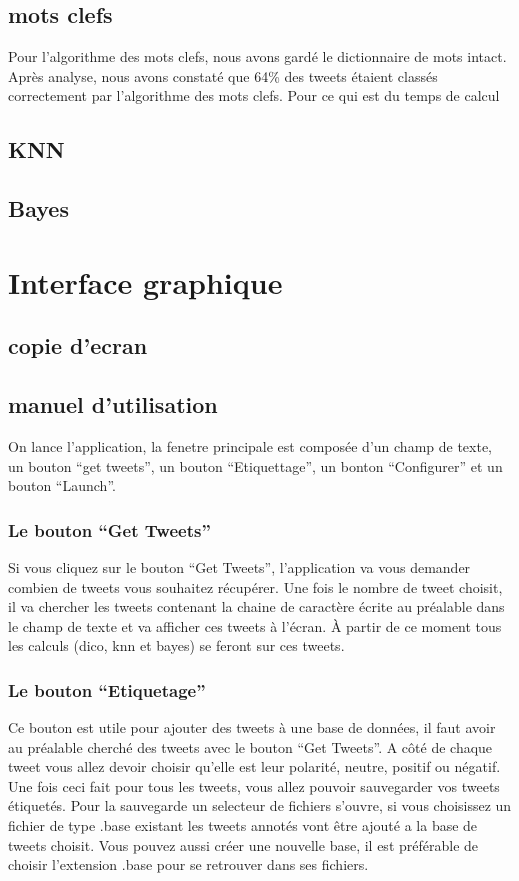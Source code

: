 \documentclass[a4paper,10pt]{report}
\begin{document}
    \subsection{mots clefs}
      Pour l'algorithme des mots clefs, nous avons gardé le dictionnaire de mots intact.
      Après analyse, nous avons constaté que 64\% des tweets étaient classés correctement par l'algorithme des mots clefs.
      Pour ce qui est du temps de calcul %
      
      
    \subsection{KNN}
      
    \subsection{Bayes}
  \section{Interface graphique}
    \subsection{copie d'ecran}
    \subsection{manuel d'utilisation}
      On lance l'application, la fenetre principale est composée d'un champ de texte, un bouton ``get tweets'', un bouton ``Etiquettage'', un bonton ``Configurer'' et 
      un bouton ``Launch''.
      \subsubsection{Le bouton ``Get Tweets''}
	Si vous cliquez sur le bouton ``Get Tweets'', l'application va vous demander combien de tweets vous souhaitez récupérer. Une fois le nombre de tweet choisit,
	il va chercher les tweets contenant la chaine de caractère écrite au préalable dans le champ de texte et va afficher ces tweets à l'écran.
	À partir de ce moment tous les calculs (dico, knn et bayes) se feront sur ces tweets.
      \subsubsection{Le bouton ``Etiquetage''}
	Ce bouton est utile pour ajouter des tweets à une base de données, il faut avoir au préalable cherché des tweets avec le bouton ``Get Tweets''.
	A côté de chaque tweet vous allez devoir choisir qu'elle est leur polarité, neutre, positif ou négatif. Une fois ceci fait pour tous les tweets, vous 
	allez pouvoir sauvegarder vos tweets étiquetés. Pour la sauvegarde un selecteur de fichiers s'ouvre, si vous choisissez un fichier de type .base existant
	les tweets annotés vont être ajouté a la base de tweets choisit. Vous pouvez aussi créer une nouvelle base, il est préférable de choisir l'extension .base
	pour se retrouver dans ses fichiers.
\end{document}
